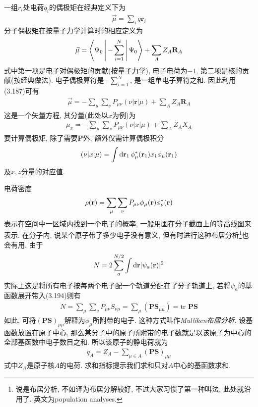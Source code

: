 一组$r_i$处电荷$q_i$的偶极矩在经典定义下为
\begin{align}
\vec{\mu} = \sum_i q\mathbf{r}_i
\end{align}
分子偶极矩在按量子力学计算时的相应定义为
\begin{align}
\vec{\mu} = \Braket{\Psi_0|-\sum_{i=1}^{N}|\Psi_0} + \sum_AZ_A\mathbf{R}_A
\end{align}
式中第一项是电子对偶极矩的贡献(按量子力学), 电子电荷为$-1$, 第二项是核的贡献(按经典做法). 电子偶极算符是$-\sum_{i=1}^{N}$, 是一组单电子算符之和. 因此利用(3.187)可有
\begin{align}
\vec{\mu} = -\sum_\mu\sum_\nu P_{\mu\nu}(\nu|\mathbf{r}|\mu) + \sum_AZ_A\mathbf{R}_A
\end{align}
这是一个矢量方程, 其分量(此处以$x$为例)为
\begin{align}
\mu_x = -\sum_\mu\sum_\nu P_{\mu\nu}(\nu|x|\mu) + \sum_AZ_AX_A
\end{align}
要计算偶极矩, 除了需要$\mathbf{P}$外, 额外仅需计算偶极积分
\begin{align}
(\nu|x|\mu) = \int\dd{r}_1\,\phi_\mu^*(\bfr_1)x_1\phi_\mu(\bfr_1)
\end{align}
及$x,z$分量的对应值.

电荷密度
\begin{align}
\rho(\mathbf{r}) = \sum_\mu\sum_\nu P_{\mu\nu}\phi_\mu(\mathbf{r})\phi_\nu^*(\mathbf{r})
\end{align}
表示在空间中一区域内找到一个电子的概率, 一般用画在分子截面上的等高线图来表示. 在分子内, 说某个原子带了多少电子没有意义, 但有时进行这种布居分析\footnote{
说是布居分析, 不如译为布居分解较好, 不过大家习惯了第一种叫法, 此处就沿用了. 英文为population analyses.
}也会有用. 由于
\begin{align}
N = 2\sum_{a}^{N/2}\int\dd{r}|\psi_a(\bfr)|^2
\end{align}
实际上这是将所有电子按每两个电子配一个轨道分配在了分子轨道上, 若将$\psi_a$的基函数展开带入(3.194)则有
\begin{align}
N = \sum_\mu\sum_\nu P_{\mu\nu}S_{\nu\mu} = \sum_\mu(\mathbf{PS}_{\mu\mu}) = \mathrm{tr}\,\,\mathbf{PS}
\end{align}
如此, 可将$(\mathbf{PS})_{\mu\mu}$解释为$\phi_\mu$所附带的电子. 这种方式叫作\emph{Mulliken布居分析}. 设基函数放置在原子中心, 那么某分子中的原子所附带的电子数就是以该原子为中心的全部基函数中电子数目之和. 所以该原子的静电荷就为
\begin{align}
q_A = Z_A - \sum_{\mu\in A}(\mathbf{PS})_{\mu\mu}
\end{align}
式中$Z_A$是原子核$A$的电荷. 求和指标提示我们求和只对$A$中心的基函数求和.

